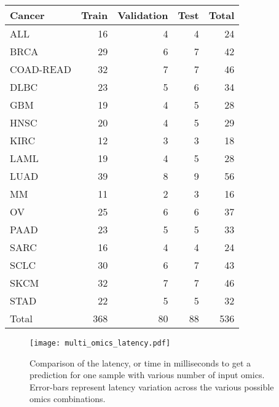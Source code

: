 \begin{table}[htbp]
     \begin{subtable}[t]{0.45\textwidth}
         \subcaption{}
         \begin{tabular}{lrrrr}
             \toprule
             Cancer    & Train & Validation & Test & Total \\
             \midrule
             ALL       & 16    & 4          & 4    & 24    \\
             BRCA      & 29    & 6          & 7    & 42    \\
             COAD-READ & 32    & 7          & 7    & 46    \\
             DLBC      & 23    & 5          & 6    & 34    \\
             GBM       & 19    & 4          & 5    & 28    \\
             HNSC      & 20    & 4          & 5    & 29    \\
             KIRC      & 12    & 3          & 3    & 18    \\
             LAML      & 19    & 4          & 5    & 28    \\
             LUAD      & 39    & 8          & 9    & 56    \\
             MM        & 11    & 2          & 3    & 16    \\
             OV        & 25    & 6          & 6    & 37    \\
             PAAD      & 23    & 5          & 5    & 33    \\
             SARC      & 16    & 4          & 4    & 24    \\
             SCLC      & 30    & 6          & 7    & 43    \\
             SKCM      & 32    & 7          & 7    & 46    \\
             STAD      & 22    & 5          & 5    & 32    \\
             \midrule
             Total     & 368   & 80         & 88   & 536   \\
             \bottomrule
         \end{tabular}
         \label{tab:ccle}
     \end{subtable}
 \end{table}

 \begin{figure}
     \centering
     \texttt{[image: multi\_omics\_latency.pdf]}
     \caption{Comparison of the latency, or time in milliseconds to get a prediction for one sample with various number of input omics. Error-bars represent latency variation across the various possible omics combinations.}
     \label{fig:latency}
 \end{figure}

